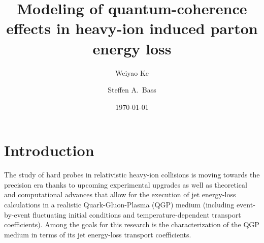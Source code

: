 \documentclass[aps, prc, reprint, amsmath, groupedaddress, nofootinbib]{revtex4-1}
\begin{document}
\title{Modeling of quantum-coherence effects in heavy-ion induced parton energy loss}
\author{Weiyao Ke}
\author{Steffen A.\ Bass}
\date{\today}
\maketitle 

\section{Introduction}
The study of hard probes in relativistic heavy-ion collisions is moving towards the precision era thanks to upcoming experimental upgrades \cite{ATLAS-Collaboration:2012iwa,Abelevetal:2014dna,STAR:upgrade-hf,Adare:2015kwa,CMS:2017dec} as well as theoretical and computational advances that allow for the execution of jet energy-loss calculations in a realistic Quark-Gluon-Plasma (QGP) medium (including event-by-event fluctuating initial conditions and temperature-dependent transport coefficients). Among the goals for this research is the characterization of the QGP medium in terms of its jet energy-loss transport coefficients.
\end{document}
